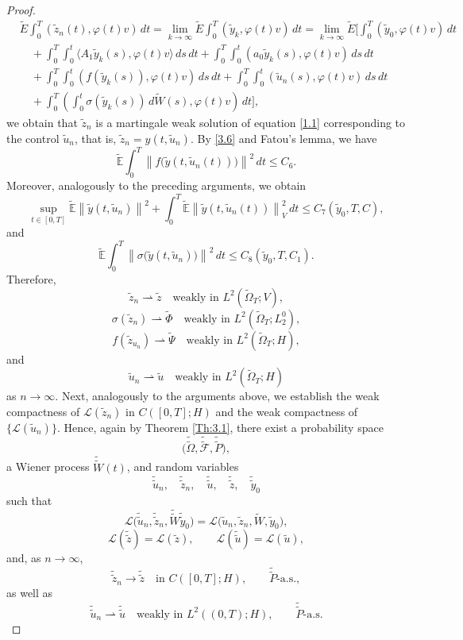 \documentclass[a4paper,12pt]{article}
\numberwithin{equation}{section}
\newcommand{\wwtilde}[1]{\widetilde{\widetilde{#1}}}
\begin{document}
\begin{proof}
\begin{align*}
& \widetilde E\int_0^T
(\widetilde z_n(t),\varphi(t)v)\,dt
= \lim_{k\to\infty}
\widetilde E
\int_0^T
(\widetilde y_k,\varphi(t)v)\,dt = 
\lim_{k\to\infty}
\widetilde E
\Biggl[
\int_0^T
(\widetilde y_0,\varphi(t)v)\,dt
\\
&\quad
+
\int_0^T\!\!\int_0^t
\langle
A_1\widetilde y_k(s),
\varphi(t)v
\rangle
\,ds\,dt
+
\int_0^T\!\!\int_0^t
(a_0\widetilde y_k(s),
\varphi(t)v)
\,ds\,dt
\\
&\quad
+
\int_0^T\!\!\int_0^t
(f(\widetilde y_k(s)),
\varphi(t)v)
\,ds\,dt
+
\int_0^T\!\!\int_0^t
(\widetilde u_n(s),
\varphi(t)v)
\,ds\,dt
\\
&\quad
+
\int_0^T
\left(
\int_0^t
\sigma(\widetilde y_k(s))
\,d\widetilde W(s),
\varphi(t)v
\right) \, dt
\Biggr],
\end{align*}
we obtain that $\widetilde{z}_n$ is a martingale weak solution of
equation \eqref{1.1} corresponding to the control $\widetilde{u}_n$,
that is, $\widetilde{z}_n=y(t,\widetilde{u}_n)$. By \eqref{3.6} and
Fatou's lemma, we have
\begin{equation}
\widetilde{\mathbb{E}}
\int_0^T
\left\|
f\bigl(\widetilde{y}(t,\widetilde{u}_n(t))\bigr)
\right\|^2\,dt
\leq C_6.
\label{3.11}
\end{equation}
Moreover, analogously to the preceding arguments, we obtain
\[
\sup_{t\in[0,T]}
\widetilde{\mathbb{E}}
\left\|
\widetilde{y}(t,\widetilde{u}_n)
\right\|^2
+
\int_0^T
\widetilde{\mathbb{E}}
\left\|
\widetilde{y}(t,\widetilde{u}_n(t))
\right\|_V^2\,dt
\leq
C_7(\widetilde{y}_0,T,C),
\]
and
\[
\widetilde{\mathbb{E}}
\int_0^T
\left\|
\sigma\bigl(\widetilde{y}(t,\widetilde{u}_n)\bigr)
\right\|^2\,dt
\leq
C_8(\widetilde{y}_0,T,C_1).
\]
Therefore,
\[
\widetilde{z}_n
\rightharpoonup
\widetilde{z}
\quad\text{weakly in }
L^2(\widetilde{\Omega}_T;V),
\]
\[
\sigma(\widetilde{z}_n)
\rightharpoonup
\widetilde{\Phi}
\quad\text{weakly in }
L^2(\widetilde{\Omega}_T;L_2^0),
\]
\[
f(\widetilde{z}_{u_n})
\rightharpoonup
\widetilde{\Psi}
\quad\text{weakly in }
L^2(\widetilde{\Omega}_T;H),
\]
and
\[
\widetilde{u}_n
\rightharpoonup
\widetilde{u}
\quad\text{weakly in }
L^2(\widetilde{\Omega}_T;H)
\]
as $n\to\infty$.
Next, analogously to the arguments above, we establish the weak
compactness of $\mathcal{L}(\widetilde{z}_n)$ in $C([0,T];H)$
and the weak compactness of $\{\mathcal{L}(\widetilde{u}_n)\}$.
Hence, again by Theorem \ref{Th:3.1}, there exist a probability space
\[
\bigl(
\wwtilde{\Omega},
\wwtilde{\mathcal{F}},
\wwtilde{P}
\bigr),
\]
a Wiener process $\wwtilde{W}(t)$, and random variables
\[
\wwtilde{u}_n,\quad
\wwtilde{z}_n,\quad
\wwtilde{u},\quad
\wwtilde{z},\quad
\wwtilde{y}_0
\]
such that
\[
\mathcal{L}
\bigl(
\wwtilde{u}_n,
\wwtilde{z}_n, \wwtilde{W}
\wwtilde{y}_0
\bigr)
=
\mathcal{L}
\bigl(
\widetilde{u}_n,
\widetilde{z}_n, \widetilde{W},
\widetilde{y}_0
\bigr),
\]
\[
\mathcal{L}(\wwtilde{z})
=
\mathcal{L}(\widetilde{z}),
\qquad
\mathcal{L}(\wwtilde{u})
=
\mathcal{L}(\widetilde{u}),
\]
and, as $n\to\infty$,
\[
\wwtilde{z}_n
\longrightarrow
\wwtilde{z}
\quad\text{in }C([0,T];H),
\qquad
\wwtilde{P}\text{-a.s.},
\]
as well as
\[
\wwtilde{u}_n
\rightharpoonup
\wwtilde{u}
\quad\text{weakly in }L^2((0,T);H),
\qquad
\wwtilde{P}\text{-a.s.}
\]


\end{proof}
\end{document}
